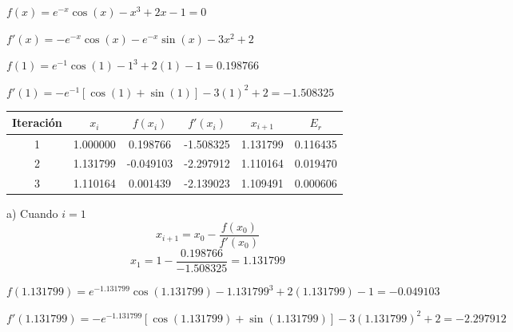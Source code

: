 \documentclass[12pt]{article}
\begin{document}
\begin{center}
\begin{center}
\end{center}

$f(x)=e^{-x}\cos(x)-x^3+2x-1=0$

$f'(x)=-e^{-x}\cos(x)-e^{-x}\sin(x)-3x^2+2$

$f(1)=e^{-1}\cos(1)-1^3+2(1)-1=0.198766$

$f'(1)=-e^{-1}[\cos(1)+\sin(1)]-3(1)^2+2=-1.508325$

\vspace{0.5cm}

\begin{center}
	\begin{tabular}{|c|c|c|c|c|c|}
		\hline
		\textbf{Iteración} & \textbf{$x_i$} & \textbf{$f(x_i)$} & \textbf{$f'(x_i)$} & \textbf{$x_{i+1}$} & \textbf{$E_r$} \\
		\hline
		1 & 1.000000 & 0.198766 & -1.508325 & 1.131799 & 0.116435 \\
		\hline
		2 & 1.131799 & -0.049103 & -2.297912 & 1.110164 & 0.019470 \\
		\hline
		3 & 1.110164 & 0.001439 & -2.139023 & 1.109491 & 0.000606 \\
		\hline
	\end{tabular}
\end{center}

\vspace{0.5cm}

a) Cuando $i=1$
\[x_{i+1}=x_0-\frac{f(x_0)}{f'(x_0)}\]
\[x_1=1-\frac{0.198766}{-1.508325}=1.131799\]

$f(1.131799)=e^{-1.131799}\cos(1.131799)-1.131799^3+2(1.131799)-1=-0.049103$

$f'(1.131799)=-e^{-1.131799}[\cos(1.131799)+\sin(1.131799)]-3(1.131799)^2+2=-2.297912$


\end{center}
\end{document}
